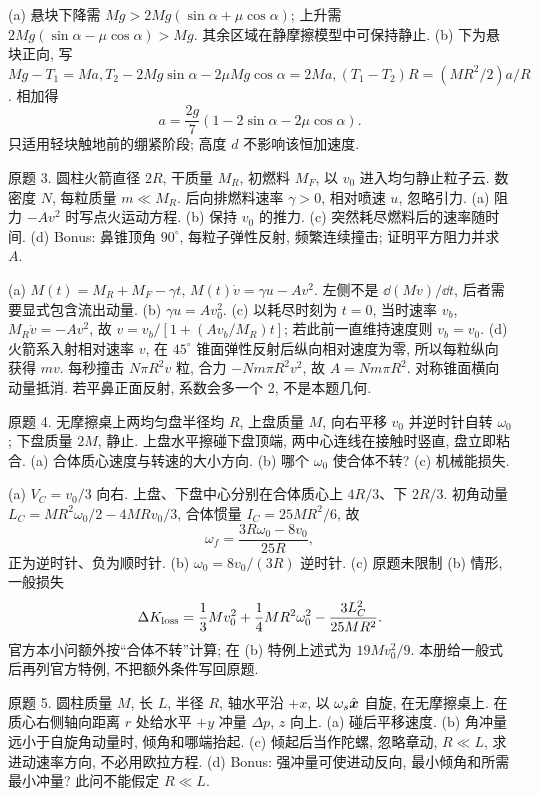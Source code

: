 \begin{solution}
(a) 悬块下降需 $Mg>2Mg(\sin\alpha+\mu\cos\alpha)$; 上升需 $2Mg(\sin\alpha-\mu\cos\alpha)>Mg$. 其余区域在静摩擦模型中可保持静止. (b) 下为悬块正向, 写 $Mg-T_1=Ma,T_2-2Mg\sin\alpha-2\mu Mg\cos\alpha=2Ma,(T_1-T_2)R=(MR^2/2)a/R$. 相加得
\[a=\frac{2g}7(1-2\sin\alpha-2\mu\cos\alpha).\]
只适用轻块触地前的绷紧阶段; 高度 $d$ 不影响该恒加速度.
\end{solution}
\begin{exercise}
原题 3. 圆柱火箭直径 $2R$, 干质量 $M_R$, 初燃料 $M_F$, 以 $v_0$ 进入均匀静止粒子云. 数密度 $N$, 每粒质量 $m\ll M_R$. 后向排燃料速率 $\gamma>0$, 相对喷速 $u$, 忽略引力. (a) 阻力 $-Av^2$ 时写点火运动方程. (b) 保持 $v_0$ 的推力. (c) 突然耗尽燃料后的速率随时间. (d) Bonus: 鼻锥顶角 $90^\circ$, 每粒子弹性反射, 频繁连续撞击; 证明平方阻力并求 $A$.
\end{exercise}
\begin{solution}
(a) $M(t)=M_R+M_F-\gamma t$, $M(t)\dot v=\gamma u-Av^2$. 左侧不是 $\dd(Mv)/\dd t$, 后者需要显式包含流出动量. (b) $\gamma u=Av_0^2$. (c) 以耗尽时刻为 $t=0$, 当时速率 $v_b$, $M_R\dot v=-Av^2$, 故 $v=v_b/[1+(Av_b/M_R)t]$; 若此前一直维持速度则 $v_b=v_0$. (d) 火箭系入射相对速率 $v$, 在 $45^\circ$ 锥面弹性反射后纵向相对速度为零, 所以每粒纵向获得 $mv$. 每秒撞击 $N\pi R^2v$ 粒, 合力 $-Nm\pi R^2v^2$, 故 $A=Nm\pi R^2$. 对称锥面横向动量抵消. 若平鼻正面反射, 系数会多一个 2, 不是本题几何.
\end{solution}
\begin{exercise}
原题 4. 无摩擦桌上两均匀盘半径均 $R$, 上盘质量 $M$, 向右平移 $v_0$ 并逆时针自转 $\omega_0$; 下盘质量 $2M$, 静止. 上盘水平擦碰下盘顶端, 两中心连线在接触时竖直, 盘立即粘合. (a) 合体质心速度与转速的大小方向. (b) 哪个 $\omega_0$ 使合体不转? (c) 机械能损失.
\end{exercise}
\begin{solution}
(a) $V_C=v_0/3$ 向右. 上盘、下盘中心分别在合体质心上 $4R/3$、下 $2R/3$. 初角动量 $L_C=MR^2\omega_0/2-4MRv_0/3$, 合体惯量 $I_C=25MR^2/6$, 故
\[\omega_f=\frac{3R\omega_0-8v_0}{25R},\]
正为逆时针、负为顺时针. (b) $\omega_0=8v_0/(3R)$ 逆时针. (c) 原题未限制 (b) 情形, 一般损失
\[\Delta K_{\rm loss}=\frac13Mv_0^2+\frac14MR^2\omega_0^2-\frac{3L_C^2}{25MR^2}.\]
官方本小问额外按“合体不转”计算; 在 (b) 特例上述式为 $19Mv_0^2/9$. 本册给一般式后再列官方特例, 不把额外条件写回原题.
\end{solution}
\begin{exercise}
原题 5. 圆柱质量 $M$, 长 $L$, 半径 $R$, 轴水平沿 $+x$, 以 $\omega_s\hat{\boldsymbol{x}}$ 自旋, 在无摩擦桌上. 在质心右侧轴向距离 $r$ 处给水平 $+y$ 冲量 $\Delta p$, $z$ 向上. (a) 碰后平移速度. (b) 角冲量远小于自旋角动量时, 倾角和哪端抬起. (c) 倾起后当作陀螺, 忽略章动, $R\ll L$, 求进动速率方向, 不必用欧拉方程. (d) Bonus: 强冲量可使进动反向, 最小倾角和所需最小冲量? 此问不能假定 $R\ll L$.
\end{exercise}
